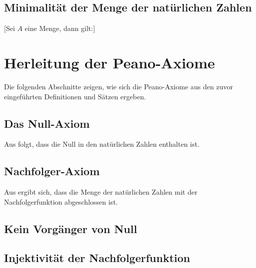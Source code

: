 \documentclass[main.tex]{subfiles}
\begin{document}
\subsection{Minimalität der Menge der natürlichen Zahlen}

[Sei \(A\) eine Menge, dann gilt:]
\begin{tabproof}
\end{tabproof}

\section{Herleitung der Peano-Axiome}

Die folgenden Abschnitte zeigen, wie sich die Peano-Axiome aus den zuvor eingeführten Definitionen und Sätzen ergeben.

\subsection{Das Null-Axiom}

Aus  folgt, dass die Null in den natürlichen Zahlen enthalten ist.

\subsection{Nachfolger‑Axiom}

Aus  ergibt sich, dass die Menge der natürlichen Zahlen mit der Nachfolgerfunktion abgeschlossen ist.

\subsection{Kein Vorgänger von Null}

\begin{tabproof}
\end{tabproof}

\subsection{Injektivität der Nachfolgerfunktion}
\end{document}
